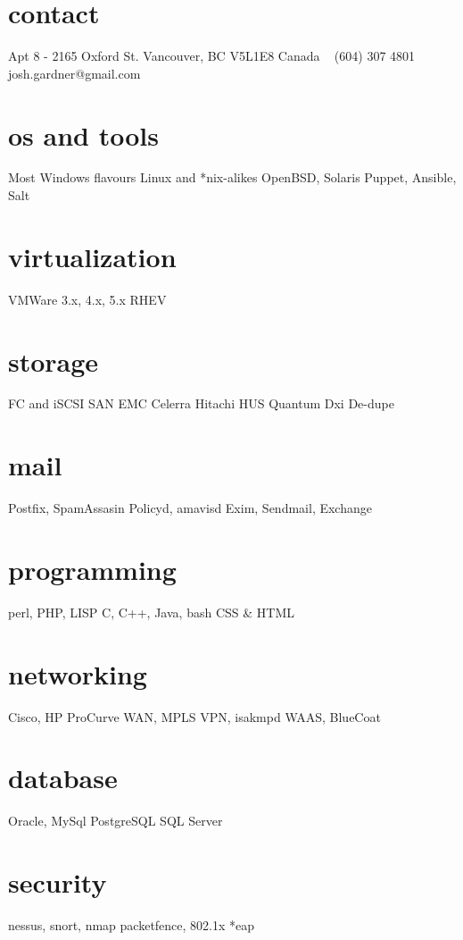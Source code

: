 \documentclass[]{friggeri-cv} %
\begin{document}


\begin{aside} %
\section{contact}
Apt 8 - 2165 Oxford St.
Vancouver, BC V5L1E8
Canada
~
(604) 307 4801
~
josh.gardner@gmail.com
\section{os and tools}
Most Windows flavours
Linux and *nix-alikes
OpenBSD, Solaris
Puppet, Ansible, Salt
\section{virtualization}
VMWare 3.x, 4.x, 5.x
RHEV
\section{storage}
FC and iSCSI SAN
EMC Celerra
Hitachi HUS
Quantum Dxi
De-dupe
\section{mail}
Postfix, SpamAssasin
Policyd, amavisd
Exim, Sendmail, Exchange
\section{programming}
perl, PHP, LISP
C, C++, Java, bash
CSS \& HTML
\section{networking}
Cisco, HP ProCurve
WAN, MPLS
VPN, isakmpd
WAAS, BlueCoat
\section{database}
Oracle, MySql
PostgreSQL
SQL Server
\section{security}
nessus, snort, nmap
packetfence, 802.1x
*eap
\end{aside}
\end{document}
